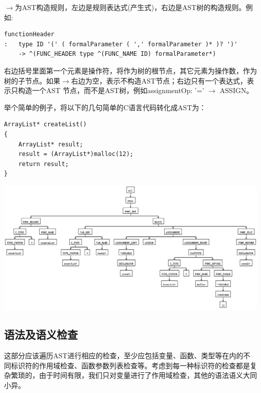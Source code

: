\documentclass[a4paper]{article}
\begin{document}
\begin{CJK*}{UTF8}{gbsn}
    \par $\rightarrow$为AST构造规则，左边是规则表达式(产生式)，右边是AST树的构造规则。例如:
    \begin{verbatim}
functionHeader
:   type ID '(' ( formalParameter ( ',' formalParameter )* )? ')'
	-> ^(FUNC_HEADER type ^(FUNC_NAME ID) formalParameter*)
    \end{verbatim}
    \par 右边括号里面第一个元素是操作符，将作为树的根节点，其它元素为操作数，作为树的子节点。如果$\rightarrow$右边为空，表示不构造AST节点；右边只有一个表达式，表示只构造一个AST 节点，而不是AST树，例如assignmentOp: '=' $\rightarrow$ ASSIGN。
    \par 举个简单的例子，将以下的几句简单的C语言代码转化成AST为：
    \begin{lstlisting}
ArrayList* createList()
{
    ArrayList* result;
    result = (ArrayList*)malloc(12);
    return result;
}
    \end{lstlisting}
    \begin{center}
    \includegraphics[width=6in]{ASTdemo.png}
    \end{center}

    \subsection{语法及语义检查}
    这部分应该遍历AST进行相应的检查，至少应包括变量、函数、类型等在内的不同标识符的作用域检查、函数参数列表检查等。考虑到每一种标识符的检查都是复杂繁琐的，由于时间有限，我们只对变量进行了作用域检查，其他的语法语义大同小异。


\end{CJK*}
\end{document}
